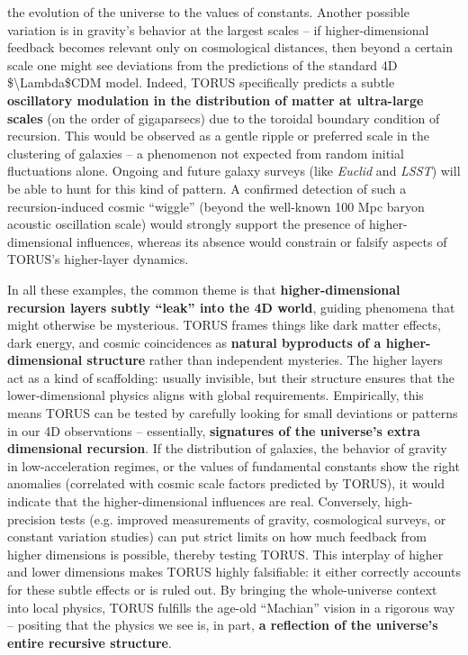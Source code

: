 \documentclass[
]{article}
\begin{document}
\begin{itemize}
  the evolution of the universe to the values of constants. Another
  possible variation is in gravity's behavior at the largest scales --
  if higher-dimensional feedback becomes relevant only on cosmological
  distances, then beyond a certain scale one might see deviations from
  the predictions of the standard 4D \$\textbackslash Lambda\$CDM model.
  Indeed, TORUS specifically predicts a subtle \textbf{oscillatory
  modulation in the distribution of matter at ultra-large scales} (on
  the order of gigaparsecs) due to the toroidal boundary condition of
  recursion\hspace{0pt}. This would be observed as a gentle ripple or
  preferred scale in the clustering of galaxies -- a phenomenon not
  expected from random initial fluctuations alone. Ongoing and future
  galaxy surveys (like \emph{Euclid} and \emph{LSST}) will be able to
  hunt for this kind of pattern\hspace{0pt}. A confirmed detection of
  such a recursion-induced cosmic ``wiggle'' (beyond the well-known 100
  Mpc baryon acoustic oscillation scale) would strongly support the
  presence of higher-dimensional influences, whereas its absence would
  constrain or falsify aspects of TORUS's higher-layer dynamics.
\end{itemize}

In all these examples, the common theme is that
\textbf{higher-dimensional recursion layers subtly ``leak'' into the 4D
world}, guiding phenomena that might otherwise be mysterious. TORUS
frames things like dark matter effects, dark energy, and cosmic
coincidences as \textbf{natural byproducts of a higher-dimensional
structure} rather than independent mysteries. The higher layers act as a
kind of scaffolding: usually invisible, but their structure ensures that
the lower-dimensional physics aligns with global requirements.
Empirically, this means TORUS can be tested by carefully looking for
small deviations or patterns in our 4D observations -- essentially,
\textbf{signatures of the universe's extra dimensional recursion}. If
the distribution of galaxies, the behavior of gravity in
low-acceleration regimes, or the values of fundamental constants show
the right anomalies (correlated with cosmic scale factors predicted by
TORUS), it would indicate that the higher-dimensional influences are
real. Conversely, high-precision tests (e.g. improved measurements of
gravity, cosmological surveys, or constant variation studies) can put
strict limits on how much feedback from higher dimensions is possible,
thereby testing TORUS. This interplay of higher and lower dimensions
makes TORUS highly falsifiable: it either correctly accounts for these
subtle effects or is ruled out. By bringing the whole-universe context
into local physics, TORUS fulfills the age-old ``Machian'' vision in a
rigorous way -- positing that the physics we see is, in part, \textbf{a
reflection of the universe's entire recursive structure}.
\end{document}

